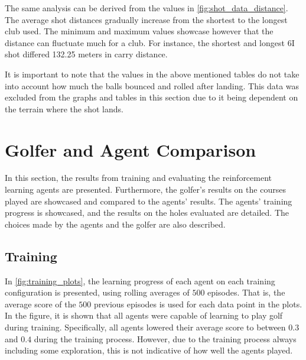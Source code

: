 \documentclass{kththesis}
\begin{document}
The same analysis can be derived from the values in \autoref{fig:shot_data_distance}. The average shot distances gradually increase from the shortest to the longest club used. The minimum and maximum values showcase however that the distance can fluctuate much for a club. For instance, the shortest and longest 6I shot differed 132.25 meters in carry distance. 

It is important to note that the values in the above mentioned tables do not take into account how much the balls bounced and rolled after landing. This data was excluded from the graphs and tables in this section due to it being dependent on the terrain where the shot lands.

\section{Golfer and Agent Comparison}
In this section, the results from training and evaluating the reinforcement learning agents are presented. Furthermore, the golfer's results on the courses played are showcased and compared to the agents' results. The agents' training progress is showcased, and the results on the holes evaluated are detailed. The choices made by the agents and the golfer are also described.

\subsection{Training}
In \autoref{fig:training_plots}, the learning progress of each agent on each training configuration is presented, using rolling averages of $500$ episodes. That is, the average score of the $500$ previous episodes is used for each data point in the plots. In the figure, it is shown that all agents were capable of learning to play golf during training. Specifically, all agents lowered their average score to between $0.3$ and $0.4$ during the training process. However, due to the training process always including some exploration, this is not indicative of how well the agents played.
\end{document}
